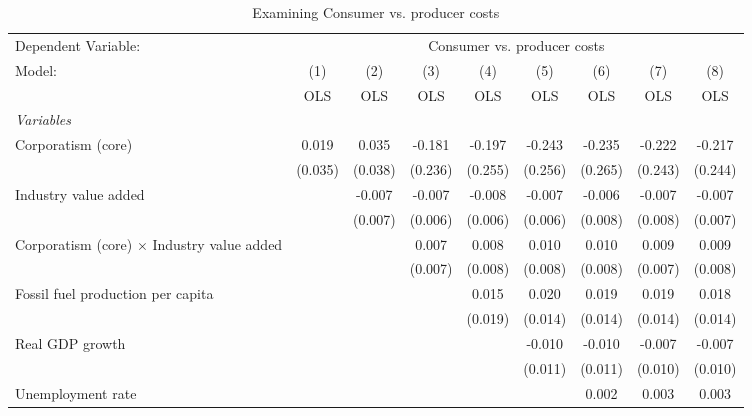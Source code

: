 
\begin{table}[htbp]
   \caption{Examining Consumer vs. producer costs}
   \centering
   \begin{tabular}{lcccccccc}
      \toprule
      Dependent Variable: & \multicolumn{8}{c}{Consumer vs. producer costs}\\
      Model:                                            & (1)     & (2)     & (3)     & (4)     & (5)     & (6)     & (7)     & (8)\\  
                                                        &  OLS    & OLS     & OLS     & OLS     & OLS     & OLS     & OLS     & OLS\\  
      \midrule
      \emph{Variables}\\
      Corporatism (core)                                & 0.019   & 0.035   & -0.181  & -0.197  & -0.243  & -0.235  & -0.222  & -0.217\\   
                                                        & (0.035) & (0.038) & (0.236) & (0.255) & (0.256) & (0.265) & (0.243) & (0.244)\\   
      Industry value added                              &         & -0.007  & -0.007  & -0.008  & -0.007  & -0.006  & -0.007  & -0.007\\   
                                                        &         & (0.007) & (0.006) & (0.006) & (0.006) & (0.008) & (0.008) & (0.007)\\   
      Corporatism (core) $\times$ Industry value added  &         &         & 0.007   & 0.008   & 0.010   & 0.010   & 0.009   & 0.009\\   
                                                        &         &         & (0.007) & (0.008) & (0.008) & (0.008) & (0.007) & (0.008)\\   
      Fossil fuel production per capita                 &         &         &         & 0.015   & 0.020   & 0.019   & 0.019   & 0.018\\   
                                                        &         &         &         & (0.019) & (0.014) & (0.014) & (0.014) & (0.014)\\   
      Real GDP growth                                   &         &         &         &         & -0.010  & -0.010  & -0.007  & -0.007\\   
                                                        &         &         &         &         & (0.011) & (0.011) & (0.010) & (0.010)\\   
      Unemployment rate                                 &         &         &         &         &         & 0.002   & 0.003   & 0.003\\   

\end{tabular}
\end{table}
